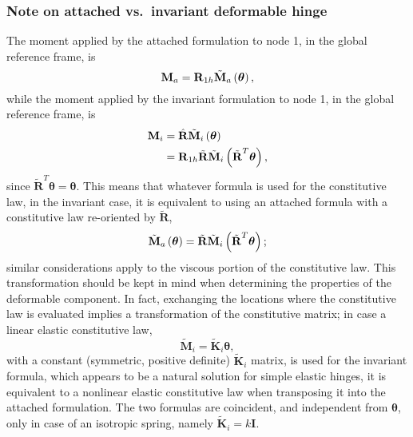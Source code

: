 \documentclass[10pt,dvips,fleqn,subeqn]{report}
\newcommand{\T}[1]{\bm{\mathbf{#1}}}
\begin{document}
\subsubsection{Note on attached vs.\ invariant deformable hinge}
The moment applied by the attached formulation to node 1,
in the global reference frame, is
\begin{equation}
	\T{M}_a = \T{R}_{1h} \tilde{\T{M}}_a\plbr{\T{\theta}} ,
\end{equation}
while the moment applied by the invariant formulation to node 1,
in the global reference frame, is
\begin{align}
	\T{M}_i
	&= \hat{\T{R}} \tilde{\T{M}}_i\plbr{\T{\theta}} \nonumber \\
	&= \T{R}_{1h} \tilde{\T{R}} \tilde{\T{M}}_i\plbr{\tilde{\T{R}}^T \T{\theta}} ,
\end{align}
since $\tilde{\T{R}}^T \T{\theta}=\T{\theta}$.
This means that whatever formula is used for the constitutive law,
in the invariant case, it is equivalent to using an attached formula 
with a constitutive law re-oriented by $\tilde{\T{R}}$,
\begin{equation}
	\tilde{\T{M}}_a\plbr{\T{\theta}}
		= \tilde{\T{R}} \tilde{\T{M}}_i\plbr{\tilde{\T{R}}^T \T{\theta}} ;
\end{equation}
similar considerations apply to the viscous portion of the constitutive law.
This transformation should be kept in mind when determining the properties
of the deformable component.
In fact, exchanging the locations where the constitutive law is evaluated
implies a transformation of the constitutive matrix; in case a linear elastic
constitutive law,
\begin{equation}
	\tilde{\T{M}}_i = \tilde{\T{K}}_i \T{\theta} ,
\end{equation}
with a constant (symmetric, positive definite) $\tilde{\T{K}}_i$ matrix,
is used for the invariant formula, which appears to be a natural solution 
for simple elastic hinges, it is equivalent to a nonlinear elastic 
constitutive law when transposing it into the attached formulation.
The two formulas are coincident, and independent from $\T{\theta}$,
only in case of an isotropic spring, namely $\tilde{\T{K}}_i=k\T{I}$.
\end{document}
